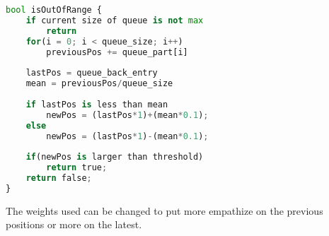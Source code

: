 \noindent
\begin{minipage}[t]{0.95\linewidth}
\begin{lstlisting}[language=Python, numbers=none, caption=XXX, label={lst:basestation2}]
bool isOutOfRange {
	if current size of queue is not max
		return
	for(i = 0; i < queue_size; i++)
		previousPos += queue_part[i]
		
	lastPos = queue_back_entry
	mean = previousPos/queue_size
	
	if lastPos is less than mean
		newPos = (lastPos*1)+(mean*0.1);
	else
		newPos = (lastPos*1)-(mean*0.1);
	
	if(newPos is larger than threshold)
		return true;
	return false;
}
\end{lstlisting}
\end{minipage}

\noindent The weights used can be changed to put more empathize on the previous positions or more on the latest.